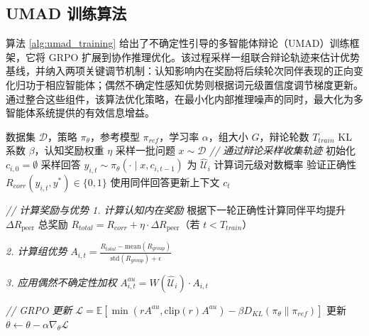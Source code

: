 \documentclass{article}
\theoremstyle{plain}
\theoremstyle{definition}
\theoremstyle{remark}
\begin{document}
\subsection{UMAD 训练算法}

算法 \ref{alg:umad_training} 给出了不确定性引导的多智能体辩论（UMAD）训练框架，它将 GRPO 扩展到协作推理优化。该过程采样一组联合辩论轨迹来估计优势基线，并纳入两项关键调节机制：认知影响内在奖励将后续轮次同伴表现的正向变化归功于相应智能体；偶然不确定性感知优势则根据词元级置信度调节梯度更新。通过整合这些组件，该算法优化策略，在最小化内部推理噪声的同时，最大化为多智能体系统提供的有效信息增益。


\begin{algorithm}[p]
   \caption{不确定性引导的多智能体辩论训练（UMAD）}
   \label{alg:umad_training}
\begin{algorithmic}[1]
   数据集 $\mathcal{D}$，策略 $\pi_{\theta}$，参考模型 $\pi_{ref}$，学习率 $\alpha$，组大小 $G$，辩论轮数 $T_{train}$
   KL 系数 $\beta$，认知奖励权重 $\eta$
       \STATE 采样一批问题 $x \sim \mathcal{D}$
           \STATE \emph{// 通过辩论采样收集轨迹}
               \STATE 初始化 $c_{i,0} = \emptyset$
                       \STATE 采样回答 $y_{i,t} \sim \pi_{\theta}(\cdot \mid x, c_{i,t-1})$
                       \STATE 为 $\hat{\mathcal{U}}_i$ 计算词元级对数概率
                       \STATE 验证正确性 $R_{corr}(y_{i,t}, y^*) \in \{0, 1\}$
                   \ENDFOR
                   \STATE 使用同伴回答更新上下文 $c_t$
               \ENDFOR
           \ENDFOR
           
           \STATE \emph{// 计算奖励与优势}
               \STATE \emph{1. 计算认知内在奖励}
               \STATE 根据下一轮正确性计算同伴平均提升 $\Delta R_{\text{peer}}$
               \STATE 总奖励 $R_{total} = R_{corr} + \eta \cdot \Delta R_{\text{peer}}$（若 $t < T_{train}$）
               
               \STATE \emph{2. 计算组优势}
               \STATE $A_{i,t} = \frac{R_{total} - \text{mean}(R_{group})}{\text{std}(R_{group}) + \epsilon}$
               
               \STATE \emph{3. 应用偶然不确定性加权}
               \STATE $A^{au}_{i,t} = W(\hat{\mathcal{U}}_i) \cdot A_{i,t}$
           \ENDFOR
           
           \STATE \emph{// GRPO 更新}
           \STATE $\mathcal{L} = \mathbb{E} \left[ \min(r A^{au}, \text{clip}(r) A^{au}) - \beta D_{KL}(\pi_\theta \| \pi_{ref}) \right]$
           \STATE 更新 $\theta \leftarrow \theta - \alpha \nabla_\theta \mathcal{L}$
       \ENDFOR
   \ENDWHILE
\end{algorithmic}
\end{algorithm}
\end{document}
